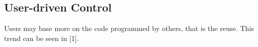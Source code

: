 \documentclass[conference]{IEEEtran}
\begin{document}
\subsection{User-driven Control}
Users may base more on the code programmed by others, that is the reuse. This trend can be seen in [1].


%
%



%
%
\end{document}
